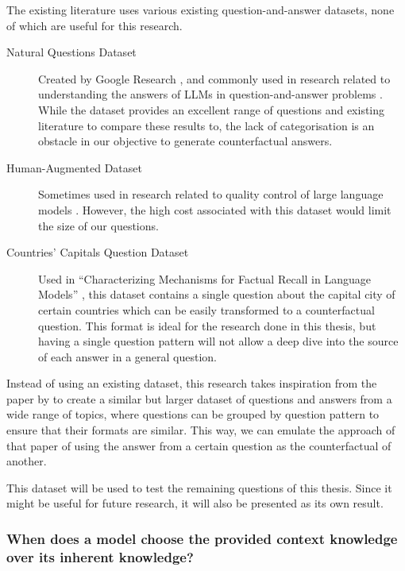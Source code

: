 The existing literature uses various existing question-and-answer datasets, none of which are useful for this research.\footnotemark{}
\begin{description}
	\item[Natural Questions Dataset] Created by Google Research \citep{natural_questions}, and commonly used in research related to understanding the answers of LLMs in question-and-answer problems \citep{ragged,when_not_to_trust_llms,can_rag_models_reason}.
		While the dataset provides an excellent range of questions and existing literature to compare these results to, the lack of categorisation is an obstacle in our objective to generate counterfactual answers.
	\item[Human-Augmented Dataset] Sometimes used in research related to quality control of large language models \citep{learning_the_difference}.
		However, the high cost associated with this dataset would limit the size of our questions.
	\item[Countries' Capitals Question Dataset] Used in ``Characterizing Mechanisms for Factual Recall in Language Models'' \citep{factual_recall}, this dataset contains a single question about the capital city of certain countries which can be easily transformed to a counterfactual question.
		This format is ideal for the research done in this thesis, but having a single question pattern will not allow a deep dive into the source of each answer in a general question.
\end{description}

Instead of using an existing dataset, this research takes inspiration from the paper by \citeauthor{factual_recall} to create a similar but larger dataset of questions and answers from a wide range of topics, where questions can be grouped by question pattern to ensure that their formats are similar.
This way, we can emulate the approach of that paper of using the answer from a certain question as the counterfactual of another.

This dataset will be used to test the remaining questions of this thesis.
Since it might be useful for future research, it will also be presented as its own result.


\subsubsection{When does a model choose the provided context knowledge over its inherent knowledge?}
\label{intro_models_numbers}

